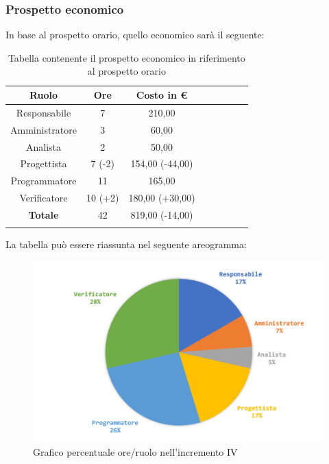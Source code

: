 		\subsubsection{Prospetto economico}
			In base al prospetto orario, quello economico sarà il seguente: 
			
			\begin{longtable}{|c|c|c|c|c|c|c|c}
				\hline
				\rowcolor{lighter-grayer}
				\textbf{Ruolo} & \textbf{Ore} & \textbf{Costo in €} \\
				\hline
				\endfirsthead
				\hline
			Responsabile 	    & 7 & 210,00\\
			\hline 
			\hline
			Amministratore	  & 3 & 60,00\\
			\hline
			\hline
			Analista 				& 2 & 50,00\\
			\hline
			\hline
			Progettista 		  & 7 (-2) & 154,00 (-44,00)\\
			\hline
			\hline
			Programmatore 	 & 11 & 165,00\\
			\hline
			\hline
			Verificatore 		  & 10 (+2) & 180,00 (+30,00) \\
			\hline
			\textbf{Totale} 	& 42 & 819,00 (-14,00)\\
			\hline
				
				\caption{Tabella contenente il prospetto economico in riferimento al prospetto orario}
			\end{longtable}
			
			La tabella può essere riassunta nel seguente areogramma:
			\begin{figure}[H]
				\centering
				\includegraphics[width=0.8\linewidth]{images/consuntivo/ConsIncr4-2.png}
				\caption{Grafico percentuale ore/ruolo nell'incremento IV}
				\label{fig:grafico costi ruolo incremento IV}
			\end{figure}
			\pagebreak	
		


